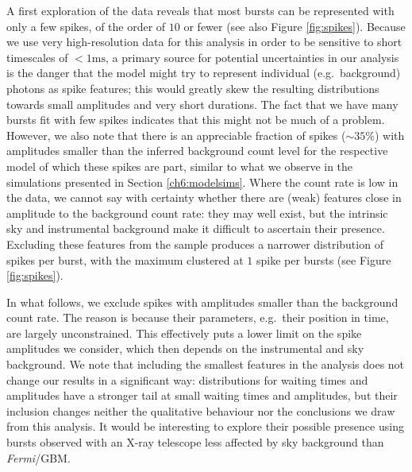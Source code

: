 \documentclass[12pt]{emulateapj}
\newcommand{\project}[1]{\textsl{#1}}
\newcommand{\fermi}{\project{Fermi}}
\begin{document}
A first exploration of the data reveals that most bursts can be represented with only a few spikes, of the order of 
$10$ or fewer (see also Figure \ref{fig:spikes}). Because we use very high-resolution data for this analysis in order to
be sensitive to short timescales of $< 1\mathrm{ms}$, a primary source for potential uncertainties in our analysis is the
danger that the model might try to represent individual (e.g.\ background) photons as spike features; this would greatly
skew the resulting distributions towards small amplitudes and very short durations. The fact that we have many bursts
fit with few spikes indicates that this might not be much of a problem. However, we also note that there is an appreciable fraction
of spikes ($\sim 35\%$) with amplitudes smaller than the inferred background count level for the respective model of which these spikes 
are part, similar to what we observe in the simulations presented in Section \ref{ch6:modelsims}. Where the count rate is low in the
data, we cannot say with certainty whether there are (weak) features close in amplitude to the background count rate: they may well exist, but the intrinsic sky and instrumental background
 make it difficult to ascertain their presence. Excluding these features from the sample produces a narrower distribution
of spikes per burst, with the maximum clustered at $1$ spike per bursts (see Figure \ref{fig:spikes}).


In what follows, we exclude spikes with amplitudes smaller than the background count rate. The reason is because
 their parameters, e.g.\ their position in time, are largely unconstrained.
This effectively puts a lower limit on the spike amplitudes we consider, which then depends on the instrumental and sky background. We note
that including the smallest features in the analysis does not change our results in a significant way: distributions for 
waiting times and amplitudes have a stronger tail at small waiting times and amplitudes, but their inclusion changes neither
the qualitative behaviour nor the conclusions we draw from this analysis. It would be interesting to explore their possible presence
using bursts observed with an X-ray telescope less affected by sky background than \fermi/GBM.
\end{document}
